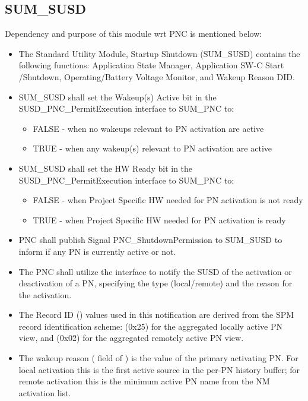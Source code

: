 \subsection{SUM\_SUSD}
\label{subsection:SumSusd}

Dependency and purpose of this module wrt PNC is mentioned below:

\begin{itemize}
\item The Standard Utility Module, Startup Shutdown (SUM\_SUSD) contains the following functions: Application State Manager, Application SW-C Start /Shutdown, Operating/Battery Voltage Monitor, and Wakeup Reason DID.
\item SUM\_SUSD shall set the Wakeup(s) Active bit in the SUSD\_PNC\_PermitExecution interface to SUM\_PNC to:
\begin{itemize}
	\item FALSE - when no wakeups relevant to PN activation are active
	\item TRUE - when any wakeup(s) relevant to PN activation are active
\end{itemize}
\item SUM\_SUSD shall set the HW Ready bit in the SUSD\_PNC\_PermitExecution interface to SUM\_PNC to:
\begin{itemize}
	\item FALSE - when Project Specific HW needed for PN activation is not ready
	\item TRUE - when Project Specific HW needed for PN activation is ready
\end{itemize}
\item PNC shall publish Signal PNC\_ShutdownPermission to SUM\_SUSD to inform if any PN is currently active or not.
\end{itemize}
\begin{itemize}
    \item The PNC shall utilize the  interface to notify the SUSD of the activation or deactivation of a PN, specifying the type (local/remote) and the reason for the activation.
    \item The Record ID () values used in this notification are derived from the SPM record identification scheme:  (0x25) for the aggregated locally active PN view, and  (0x02) for the aggregated remotely active PN view.
    \item The wakeup reason ( field of ) is the  value of the primary activating PN. For local activation this is the first active source in the per-PN history buffer; for remote activation this is the minimum active PN name from the NM activation list.
\end{itemize}

